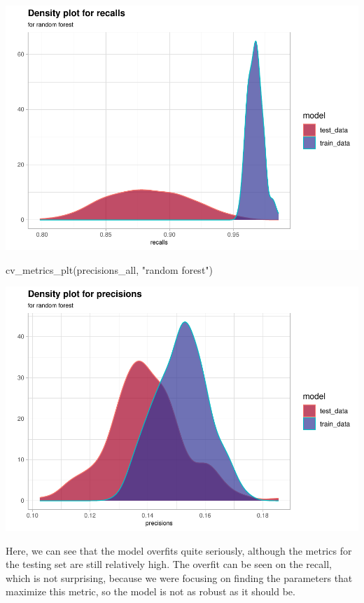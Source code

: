 \documentclass[
]{report}
\newenvironment{Shaded}{\begin{snugshade}}{\end{snugshade}}
\newcommand{\FunctionTok}[1]{\textcolor[rgb]{0.00,0.00,0.00}{#1}}
\newcommand{\NormalTok}[1]{#1}
\newcommand{\StringTok}[1]{\textcolor[rgb]{0.31,0.60,0.02}{#1}}
\begin{document}
\includegraphics{credit_card_fraud_detection_files/figure-latex/cv_rf-1.pdf}

\begin{Shaded}
\begin{Highlighting}[]
\FunctionTok{cv\_metrics\_plt}\NormalTok{(precisions\_all, }\StringTok{"random forest"}\NormalTok{)}
\end{Highlighting}
\end{Shaded}

\includegraphics{credit_card_fraud_detection_files/figure-latex/cv_rf-2.pdf}

Here, we can see that the model overfits quite seriously, although the
metrics for the testing set are still relatively high. The overfit can
be seen on the recall, which is not surprising, because we were focusing
on finding the parameters that maximize this metric, so the model is not
as robust as it should be.
\end{document}
